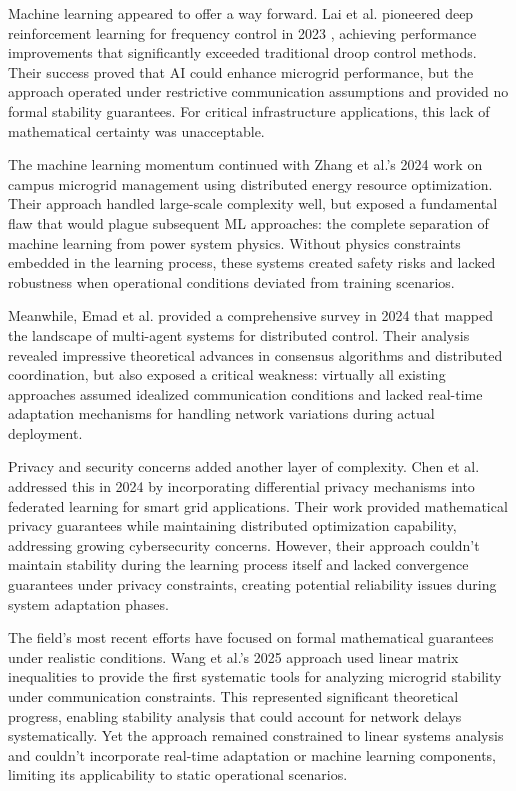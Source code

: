 \documentclass[12pt]{article}
\begin{document}
Machine learning appeared to offer a way forward. Lai et al. pioneered deep reinforcement learning for frequency control in 2023 \cite{lai2023}, achieving performance improvements that significantly exceeded traditional droop control methods. Their success proved that AI could enhance microgrid performance, but the approach operated under restrictive communication assumptions and provided no formal stability guarantees. For critical infrastructure applications, this lack of mathematical certainty was unacceptable.

The machine learning momentum continued with Zhang et al.'s 2024 work \cite{zhang2024} on campus microgrid management using distributed energy resource optimization. Their approach handled large-scale complexity well, but exposed a fundamental flaw that would plague subsequent ML approaches: the complete separation of machine learning from power system physics. Without physics constraints embedded in the learning process, these systems created safety risks and lacked robustness when operational conditions deviated from training scenarios.

Meanwhile, Emad et al. provided a comprehensive survey in 2024 \cite{emad2024} that mapped the landscape of multi-agent systems for distributed control. Their analysis revealed impressive theoretical advances in consensus algorithms and distributed coordination, but also exposed a critical weakness: virtually all existing approaches assumed idealized communication conditions and lacked real-time adaptation mechanisms for handling network variations during actual deployment.

Privacy and security concerns added another layer of complexity. Chen et al. addressed this in 2024 \cite{chen2024} by incorporating differential privacy mechanisms into federated learning for smart grid applications. Their work provided mathematical privacy guarantees while maintaining distributed optimization capability, addressing growing cybersecurity concerns. However, their approach couldn't maintain stability during the learning process itself and lacked convergence guarantees under privacy constraints, creating potential reliability issues during system adaptation phases.

The field's most recent efforts have focused on formal mathematical guarantees under realistic conditions. Wang et al.'s 2025 approach \cite{wang2025} used linear matrix inequalities to provide the first systematic tools for analyzing microgrid stability under communication constraints. This represented significant theoretical progress, enabling stability analysis that could account for network delays systematically. Yet the approach remained constrained to linear systems analysis and couldn't incorporate real-time adaptation or machine learning components, limiting its applicability to static operational scenarios.
\end{document}

